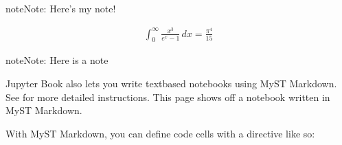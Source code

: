 \documentclass[letterpaper,10pt,english]{jupyterBook}
\begin{document}
\begin{sphinxShadowBox}
\sphinxstylesidebartitle{}

\begin{sphinxadmonition}{note}{Note:}
\sphinxAtStartPar
Here’s my note!
\end{sphinxadmonition}
\end{sphinxShadowBox}
\begin{equation*}
\begin{split}
  \int_0^\infty \frac{x^3}{e^x-1}\,dx = \frac{\pi^4}{15}
\end{split}
\end{equation*}
\begin{sphinxadmonition}{note}{Note:}
\sphinxAtStartPar
Here is a note
\end{sphinxadmonition}

\begin{DUlineblock}{0em}
\item[] 
\end{DUlineblock}

\sphinxAtStartPar
Jupyter Book also lets you write text\sphinxhyphen{}based notebooks using MyST Markdown.
See  for more detailed instructions.
This page shows off a notebook written in MyST Markdown.

\begin{DUlineblock}{0em}
\item[] 
\end{DUlineblock}

\sphinxAtStartPar
With MyST Markdown, you can define code cells with a directive like so:
\end{document}
